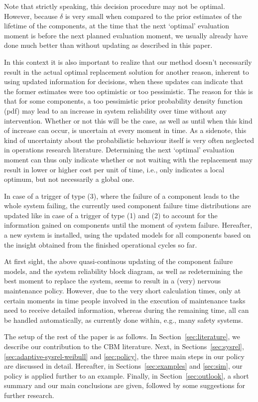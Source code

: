 \documentclass[authoryear]{elsarticle}
\begin{document}
Note that strictly speaking, this decision procedure may not be optimal.
However, because $\delta$ is very small when compared to the prior estimates of the lifetime of the components,
at the time that the next `optimal' evaluation moment is before the next planned evaluation moment,
we usually already have done much better than without updating as described in this paper.

In this context it is also important to realize that our method
doesn't necessarily result in the actual optimal replacement solution for another reason,
inherent to using updated information for decisions,
when these updates can indicate that the former estimates were too optimistic or too pessimistic.
The reason for this is that for some components,
a too pessimistic prior probability density function (pdf)
may lead to an increase in system reliability over time without any intervention.
Whether or not this will be the case, as well as until when this kind of increase can occur,
is uncertain at every moment in time.
As a sidenote,
this kind of uncertainty about the probabilistic behaviour itself is very often neglected in operations research literature.
Determining the next `optimal' evaluation moment can thus only indicate whether or not waiting with the replacement
may result in lower or higher cost per unit of time,
i.e., only indicates a local optimum,
but not necessarily a global one.

In case of a trigger of type (3),
where the failure of a component leads to the whole system failing,
the currently used component failure time distributions are updated
like in case of a trigger of type (1) and (2)
to account for the information gained on components
until the moment of system failure.
Hereafter, a new system is installed,
using the updated models for all components based on the insight obtained from the finished operational cycles so far.

At first sight, the above quasi-continous updating of the component failure models,
and the system reliability block diagram,
as well as redetermining the best moment to replace the system,
seems to result in a (very) nervous maintenance policy.
However, due to the very short calculation times,
only at certain moments in time people involved in the execution of maintenance tasks
need to receive detailed information,
whereas during the remaining time,
all can be handled automatically, as currently done within, e.g., many safety systems. 

The setup of the rest of the paper is as follows.
In Section~\ref{sec:literature}, we describe our contribution to the CBM literature.
Next, in Sections~\ref{sec:sysrel}, \ref{sec:adaptive-sysrel-weibull} and \ref{sec:policy},
the three main steps in our policy are discussed in detail.
Hereafter, in Sections~\ref{sec:examples} and \ref{sec:sim},
our policy is applied further to an example.
Finally, in Section~\ref{sec:outlook},
a short summary and our main conclusions are given,
followed by some suggestions for further research.
\end{document}
